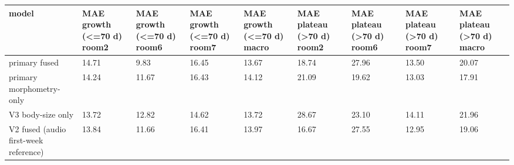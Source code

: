 \begin{tabular}{lllllllll}
\hline
model & MAE growth (<=70 d) room2 & MAE growth (<=70 d) room6 & MAE growth (<=70 d) room7 & MAE growth (<=70 d) macro & MAE plateau (>70 d) room2 & MAE plateau (>70 d) room6 & MAE plateau (>70 d) room7 & MAE plateau (>70 d) macro \\
\hline
primary fused & 14.71 & 9.83 & 16.45 & 13.67 & 18.74 & 27.96 & 13.50 & 20.07 \\
primary morphometry-only & 14.24 & 11.67 & 16.43 & 14.12 & 21.09 & 19.62 & 13.03 & 17.91 \\
V3 body-size only & 13.72 & 12.82 & 14.62 & 13.72 & 28.67 & 23.10 & 14.11 & 21.96 \\
V2 fused (audio first-week reference) & 13.84 & 11.66 & 16.41 & 13.97 & 16.67 & 27.55 & 12.95 & 19.06 \\
\hline
\end{tabular}
